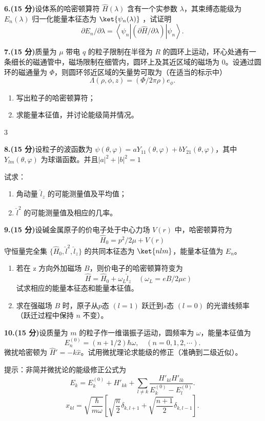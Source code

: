 \textbf{6.(15 分)}设体系的哈密顿算符 $\hat{H}(\lambda)$ 含有一个实参数 $\lambda$，其束缚态能级为 $E_n(\lambda)$ 归一化能量本征态为 $\ket{\psi_n(\lambda)}$ ，试证明
\[
\partial E_n/\partial \lambda = \left\langle \psi_n \left| (\partial \hat{H}/\partial \lambda) \right| \psi_n \right\rangle.~
\]

\textbf{7.(15 分)}质量为 $\mu$ 带电 $q$ 的粒子限制在半径为 $R$ 的圆环上运动，环心处通有一条细长的磁通管中，磁场限制在细管内，圆环上及其近区域的磁场为 $0$。设通过圆环的磁通量为 $\Phi$，则圆环邻近区域的矢量势可取为（在适当的标示中）
\[
\Lambda(\rho, \phi, z) = \left( \Phi/2\pi\rho \right) e_\phi.~
\]

\begin{enumerate}
    \item 写出粒子的哈密顿算符；
    \item 求能量本征值，并讨论能级简并情况。
\end{enumerate}3

\textbf{8.(15 分)}设粒子的波函数为 $\psi(\theta, \varphi) = aY_{11}(\theta, \varphi) + bY_{21}(\theta, \varphi)$，其中 $Y_{lm}(\theta, \varphi)$ 为球谐函数。并且$|a|^2 + |b|^2 = 1$

试求：
\begin{enumerate}
    \item  角动量 $\hat{l}_z$ 的可能测量值及平均值；
    \item  $\hat{l}^2$ 的可能测量值及相应的几率。
\end{enumerate}

\textbf{9.(15 分)}设碱金属原子的价电子处于中心力场 $V(r)$ 中，哈密顿算符为
\[
\hat{H}_0 =p^2/2\mu + V(r)~
\]
守恒量完全集 $\{\hat{H}_0, \hat{l}^2, \hat{l}_z\}$ 的共同本征态为 $\ket{nlm}$，能量本征值为 $E_n$。

\begin{enumerate}
    \item  若在 z 方向外加磁场 $B$，则价电子的哈密顿算符变为
    \[
    \hat{H} = \hat{H}_0 + \omega_L \hat{l}_z \quad (\omega_L = eB/2\mu c)~
    \]
    试求相应的能量本征态和能量本征值。

    \item  求在强磁场 $B$ 时，原子从$p$态 $(l = 1)$ 跃迁到$s$态 $(l = 0)$ 的光谱线频率（跃迁过程中保持 $n$ 不变）。
\end{enumerate}

\textbf{10.(15 分)}设质量为 $m$ 的粒子作一维谐振子运动，圆频率为 $\omega$，能量本征值为
\[
E_n^{(0)} = \left(n + 1/2\right)\hbar\omega, \quad (n = 0,1,2,\cdots).~
\]
微扰哈密顿为 $\hat{H}' = -k\hat{x}$。试用微扰理论求能级的修正（准确到二级近似）。

提示：非简并微扰论的能级修正公式为
\[
E_k = E_k^{(0)} + H'_{kk} + \sum_{l \neq k} \frac{H'_{kl} H'_{lk}}{E_k^{(0)} - E_l^{(0)}}.~
\]
\[
x_{kl} = \sqrt{\frac{\hbar}{m\omega}}\left[\sqrt{\frac{n}{2}} \delta_{k, l+1} + \sqrt{\frac{n+1}{2}} \delta_{k, l-1}\right].~
\]